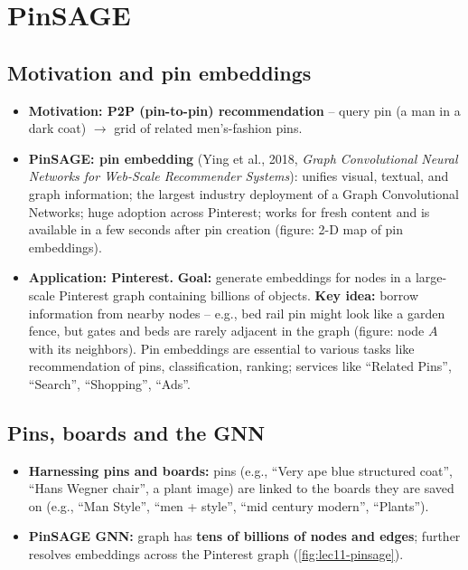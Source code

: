 \section{PinSAGE}\label{sec:lec11-pinsage}

\subsection{Motivation and pin embeddings}\label{sec:lec11-pin-motiv}

\begin{itemize}
  \item \textbf{Motivation: P2P (pin-to-pin) recommendation} -- query pin (a
    man in a dark coat) $\to$ grid of related men's-fashion pins.
  \item \textbf{PinSAGE: pin embedding} (Ying et al., 2018, \emph{Graph
    Convolutional Neural Networks for Web-Scale Recommender Systems}): unifies
    visual, textual, and graph information; the largest industry deployment of
    a Graph Convolutional Networks; huge adoption across Pinterest; works for
    fresh content and is available in a few seconds after pin creation
    (figure: 2-D map of pin embeddings).
  \item \textbf{Application: Pinterest.} \textbf{Goal:} generate embeddings for
    nodes in a large-scale Pinterest graph containing billions of objects.
    \textbf{Key idea:} borrow information from nearby nodes -- e.g., bed rail
    pin might look like a garden fence, but gates and beds are rarely adjacent
    in the graph (figure: node $A$ with its neighbors). Pin embeddings are
    essential to various tasks like recommendation of pins, classification,
    ranking; services like ``Related Pins'', ``Search'', ``Shopping'',
    ``Ads''.
\end{itemize}

\subsection{Pins, boards and the GNN}\label{sec:lec11-pin-graph}

\begin{itemize}
  \item \textbf{Harnessing pins and boards:} pins (e.g., ``Very ape blue
    structured coat'', ``Hans Wegner chair'', a plant image) are linked to the
    boards they are saved on (e.g., ``Man Style'', ``men + style'', ``mid
    century modern'', ``Plants'').
  \item \textbf{PinSAGE GNN:} graph has \textbf{tens of billions of nodes and
    edges}; further resolves embeddings across the Pinterest graph
    (\cref{fig:lec11-pinsage}).
\end{itemize}

